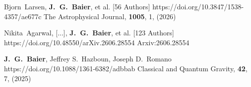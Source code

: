          {Bjorn~{Larsen}, \textbf{J.~G.~{Baier}}, et al. [56 Authors]}
         {https://doi.org/10.3847/1538-4357/ae677c}
         {{The Astrophysical Journal}, \textbf{1005}, 1, (2026)}

         {Nikita~{Agarwal}, [...], \textbf{J.~G.~{Baier}}, et al. [123 Authors]}
         {https://doi.org/10.48550/arXiv.2606.28554}
         {{Arxiv:}2606.28554}

         {\textbf{J.~G.~{Baier}}, Jeffrey S.~{Hazboun}, Joseph D.~{Romano}}
         {https://doi.org/10.1088/1361-6382/adbbab}
         {{Classical and Quantum Gravity}, \textbf{42}, 7, (2025)}

